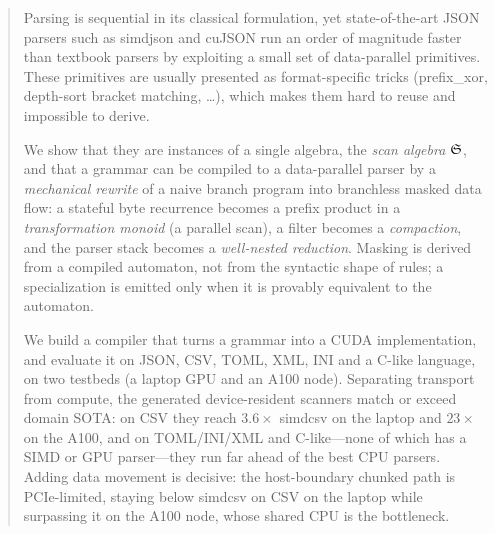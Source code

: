 \begin{abstract}
Parsing is sequential in its classical formulation, yet state-of-the-art JSON
parsers such as \textsf{simdjson} and \textsf{cuJSON} run an order of magnitude
faster than textbook parsers by exploiting a small set of data-parallel
primitives.  These primitives are usually presented as format-specific tricks
(\textsf{prefix\_xor}, depth-sort bracket matching, \ldots), which makes them
hard to reuse and impossible to derive.

We show that they are instances of a single algebra, the \emph{scan algebra} $\SA$, and that
a grammar can be compiled to a data-parallel parser by a \emph{mechanical
rewrite} of a naive branch program into branchless masked data flow:
a stateful byte recurrence becomes a prefix product in a \emph{transformation
monoid} (a parallel scan), a filter becomes a \emph{compaction}, and the parser
stack becomes a \emph{well-nested reduction}.  Masking is derived from a
compiled automaton, not from the syntactic shape of rules; a specialization is
emitted only when it is provably equivalent to the automaton.

We build a compiler that turns a grammar into a CUDA implementation, and
evaluate it on JSON, CSV, TOML, XML, INI and a C-like language, on two testbeds
(a laptop GPU and an A100 node).  Separating transport from compute, the
generated device-resident scanners match or exceed domain SOTA: on CSV they
reach $3.6\times$ \textsf{simdcsv} on the laptop and $23\times$ on the A100,
and on TOML/INI/XML and C-like---none of which has a SIMD or GPU parser---they
run far ahead of the best CPU parsers.  Adding data movement is decisive: the
host-boundary chunked path is PCIe-limited, staying below \textsf{simdcsv} on
CSV on the laptop while surpassing it on the A100 node, whose shared CPU is the
bottleneck.
\end{abstract}
